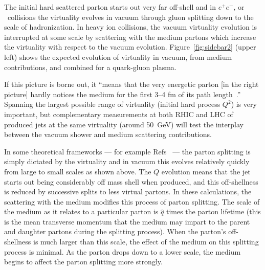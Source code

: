 The initial hard scattered parton starts out very far off-shell and in
$e^{+}e^{-}$, \pp or \ppbar~collisions the virtuality evolves in
vacuum through gluon splitting down to the scale of hadronization.  In
heavy ion collisions, the vacuum virtuality evolution is interrupted
at some scale by scattering with the medium partons which increase the
virtuality with respect to the vacuum evolution.
Figure~\ref{fig:sidebar2} (upper left) shows the expected evolution of
virtuality in vacuum, from medium contributions, and combined for a
quark-gluon plasma.

If this picture is borne out, it ``means that the very energetic parton [in
the right picture] hardly notices the medium for the first 3--4 fm of
its path length~\cite{Muller:2010pm}.'' Spanning the largest possible
range of virtuality (initial hard process $Q^{2}$) is very important,
but complementary measurements at both RHIC and LHC of produced jets
at the same virtuality (around 50~GeV) will test the interplay between
the vacuum shower and medium scattering contributions.


In some theoretical frameworks --- for example
Refs~\cite{Renk:2013rla,Majumder:2011uk,Majumder:2014gda} --- the
parton splitting is simply dictated by the virtuality and in vacuum
this evolves relatively quickly from large to small scales as shown
above.  The $Q$ evolution means that the jet starts out being
considerably off mass shell when produced, and this off-shellness is
reduced by successive splits to less virtual partons.  In these
calculations, the scattering with the medium modifies this process of
parton splitting.  The scale of the medium as it relates to a
particular parton is $\hat{q}$ times the parton lifetime (this is the
mean transverse momentum that the medium may impart to the parent and
daughter partons during the splitting process). When the parton's
off-shellness is much larger than this scale, the effect of the medium
on this splitting process is minimal. As the parton drops down to a
lower scale, the medium begins to affect the parton splitting more
strongly.

